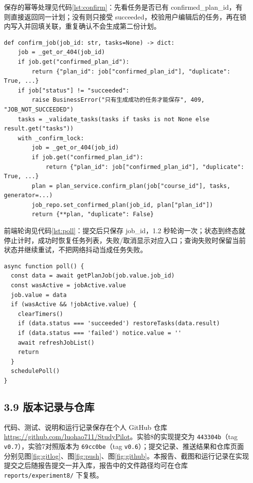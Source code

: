 \documentclass[UTF8,12pt,a4paper]{ctexart}
\begin{document}
保存的幂等处理见代码\ref{lst:confirm}：先看任务是否已有 confirmed\_plan\_id，有则直接返回同一计划；没有则只接受 succeeded，校验用户编辑后的任务，再在锁内写入并回填关联，重复确认不会生成第二份计划。

\begin{lstlisting}[caption={保存结果的任务级幂等},label={lst:confirm}]
def confirm_job(job_id: str, tasks=None) -> dict:
    job = _get_or_404(job_id)
    if job.get("confirmed_plan_id"):
        return {"plan_id": job["confirmed_plan_id"], "duplicate": True, ...}
    if job["status"] != "succeeded":
        raise BusinessError("只有生成成功的任务才能保存", 409, "JOB_NOT_SUCCEEDED")
    tasks = _validate_tasks(tasks if tasks is not None else result.get("tasks"))
    with _confirm_lock:
        job = _get_or_404(job_id)
        if job.get("confirmed_plan_id"):
            return {"plan_id": job["confirmed_plan_id"], "duplicate": True, ...}
        plan = plan_service.confirm_plan(job["course_id"], tasks, generator=...)
        job_repo.set_confirmed_plan(job_id, plan["plan_id"])
        return {**plan, "duplicate": False}
\end{lstlisting}

前端轮询见代码\ref{lst:poll}：提交后只保存 job\_id，1.2 秒轮询一次；状态到终态就停止计时，成功时恢复任务列表，失败/取消显示对应入口；查询失败时保留当前状态并继续重试，不把网络抖动当成任务失败。

\begin{lstlisting}[caption={页面轮询与终态处理（Vue 3）},label={lst:poll}]
async function poll() {
  const data = await getPlanJob(job.value.job_id)
  const wasActive = jobActive.value
  job.value = data
  if (wasActive && !jobActive.value) {
    clearTimers()
    if (data.status === 'succeeded') restoreTasks(data.result)
    if (data.status === 'failed') notice.value = ''
    await refreshJobList()
    return
  }
  schedulePoll()
}
\end{lstlisting}

\subsection*{3.9 版本记录与仓库}

代码、测试、说明和运行记录保存在个人 GitHub 仓库 \url{https://github.com/luohao711/StudyPilot}。实验8的实现提交为 \texttt{443304b}（tag \texttt{v0.7}），实验7对照版本为 \texttt{69cc0be}（tag \texttt{v0.6}）；提交记录、推送结果和仓库页面分别见图\ref{fig:gitlog}、图\ref{fig:push}、图\ref{fig:github}。本报告、截图和运行记录在实现提交之后随报告提交一并入库，报告中的文件路径均可在仓库 \texttt{reports/experiment8/} 下复核。
\end{document}
